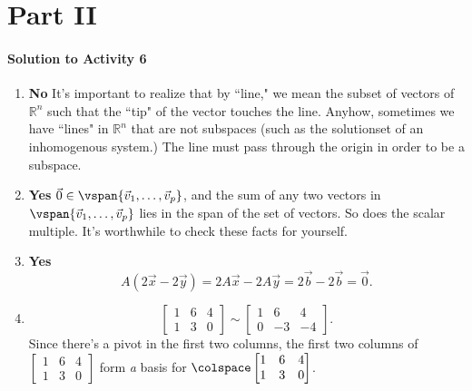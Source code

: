 \section{Part II}

\paragraph{Solution to Activity 6}
\begin{enumerate}
	\item \textbf{No} It's important to realize that by ``line," we mean the subset of vectors of \(\mathbb{R}^n\) such that the ``tip" of the vector touches the line.
				  Anyhow, sometimes we have ``lines" in \(\mathbb{R}^n\) that are not subspaces (such as the solutionset of an inhomogenous system.) The line
				  must pass through the origin in order to be a subspace.
	\item \textbf{Yes} \(\vec{0} \in \vspan\{\vec{v}_1, \dots, \vec{v}_p\}\), and the sum of any two vectors in \(\vspan \{\vec{v}_1, \dots, \vec{v}_p\}\) lies in the 
			          span of the set of vectors. So does the scalar multiple. It's worthwhile to check these facts for yourself.
	\item \textbf{Yes} \[A(2\vec{x} - 2\vec{y}) = 2A\vec{x} - 2A\vec{y} = 2\vec{b} - 2\vec{b} = \vec{0}.\]
	\item \[\begin{bmatrix}1 & 6 & 4 \\ 1 & 3 & 0\end{bmatrix} \sim \begin{bmatrix}1 & 6 & 4 \\ 0 & -3 & -4\end{bmatrix}.\] Since there's a pivot in the first two 
		columns, the first two columns of \(\begin{bmatrix}1 & 6 & 4 \\ 1 & 3 & 0\end{bmatrix}\) form \emph{a} basis for 
		\(\colspace \begin{bmatrix}1 & 6 & 4 \\ 1 & 3 & 0\end{bmatrix}\).
		

\end{enumerate}
